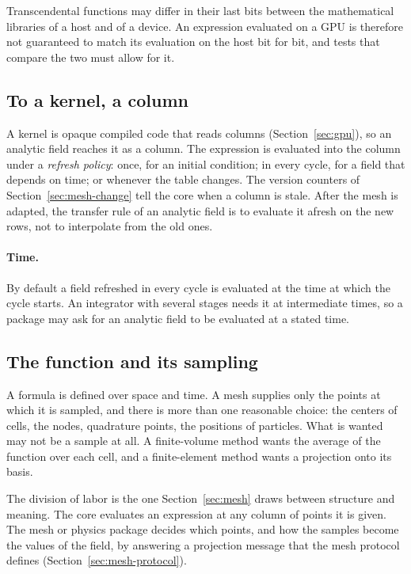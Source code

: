 \documentclass[11pt,a4paper]{article}
\begin{document}
Transcendental functions may differ in their last bits between the
mathematical libraries of a host and of a device.  An expression evaluated
on a GPU is therefore not guaranteed to match its evaluation on the host
bit for bit, and tests that compare the two must allow for it.

\subsection{To a kernel, a column}

A kernel is opaque compiled code that reads columns
(Section~\ref{sec:gpu}), so an analytic field reaches it as a column.  The
expression is evaluated into the column under a \emph{refresh policy}:
once, for an initial condition; in every cycle, for a field that depends on
time; or whenever the table changes.  The version counters of
Section~\ref{sec:mesh-change} tell the core when a column is stale.  After
the mesh is adapted, the transfer rule of an analytic field is to evaluate
it afresh on the new rows, not to interpolate from the old ones.

\paragraph{Time.}  By default a field refreshed in every cycle is evaluated
at the time at which the cycle starts.  An integrator with several stages
needs it at intermediate times, so a package may ask for an analytic field
to be evaluated at a stated time.

\subsection{The function and its sampling}

A formula is defined over space and time.  A mesh supplies only the points
at which it is sampled, and there is more than one reasonable choice: the
centers of cells, the nodes, quadrature points, the positions of particles.
What is wanted may not be a sample at all.  A finite-volume method wants
the average of the function over each cell, and a finite-element method
wants a projection onto its basis.

The division of labor is the one Section~\ref{sec:mesh} draws between
structure and meaning.  The core evaluates an expression at any column of
points it is given.  The mesh or physics package decides which points, and
how the samples become the values of the field, by answering a projection
message that the mesh protocol defines (Section~\ref{sec:mesh-protocol}).
\end{document}

